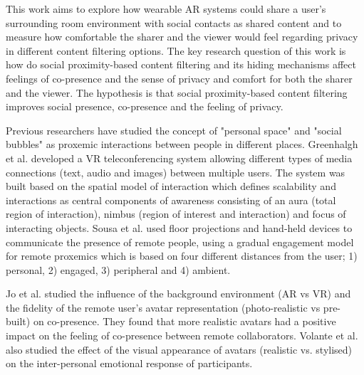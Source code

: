 This work aims to explore how wearable AR systems could share a user's surrounding room environment with social contacts as shared content and to measure how comfortable the sharer and the viewer would feel regarding privacy in different content filtering options. The key research question of this work is how do social proximity-based content filtering and its hiding mechanisms affect feelings of co-presence and the sense of privacy and comfort for both the sharer and the viewer. The hypothesis is that social proximity-based content filtering improves social presence, co-presence and the feeling of privacy. 




Previous researchers have studied the concept of "personal space" and "social bubbles" as proxemic interactions between people in different places. Greenhalgh et al. \cite{Greenhalgh1995} developed a VR teleconferencing system allowing different types of media connections (text, audio and images) between multiple users. The system was built based on the spatial model of interaction \cite{Benford1993} which defines scalability and interactions as central components of awareness consisting of an aura (total region of interaction), nimbus (region of interest and interaction) and focus of interacting objects. Sousa et al. \cite{Sousa2016} used floor projections and hand-held devices to communicate the presence of remote people, using a gradual engagement \cite{Marquardt2012} model for remote proxemics which is based on four different distances from the user; 1) personal, 2) engaged, 3) peripheral and 4) ambient.

Jo et al. \cite{Jo2016} studied the influence of the background environment (AR vs VR) and the fidelity of the remote user's avatar representation (photo-realistic vs pre-built) on co-presence. They found that more realistic avatars had a positive impact on the feeling of co-presence between remote collaborators. Volante et al. \cite{Volante2016} also studied the effect of the visual appearance of avatars (realistic vs. stylised) on the inter-personal emotional response of participants. 

